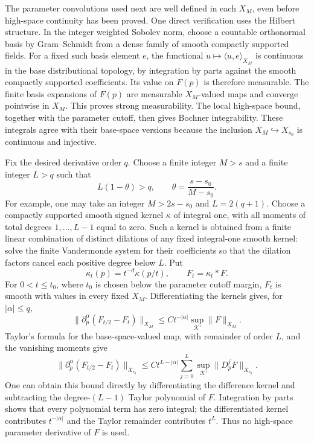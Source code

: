 \documentclass[
  english,
  11pt,
  reqno]{amsart}
\begin{document}
The parameter convolutions used next are well defined in each \(X_M\),
even before high-space continuity has been proved. One direct
verification uses the Hilbert structure. In the integer weighted Sobolev
norm, choose a countable orthonormal basis by Gram--Schmidt from a dense
family of smooth compactly supported fields. For a fixed such basis
element \(e\), the functional \(u\mapsto\langle u,e\rangle_{X_M}\) is
continuous in the base distributional topology, by integration by parts
against the smooth compactly supported coefficients. Its value on
\(F(p)\) is therefore measurable. The finite basis expansions of
\(F(p)\) are measurable \(X_M\)-valued maps and converge pointwise in
\(X_M\). This proves strong measurability. The local high-space bound,
together with the parameter cutoff, then gives Bochner integrability.
These integrals agree with their base-space versions because the
inclusion \(X_M\hookrightarrow X_{s_0}\) is continuous and injective.

Fix the desired derivative order \(q\). Choose a finite integer \(M>s\)
and a finite integer \(L>q\) such that%
 \[
L(1-\theta)>q,
\qquad \theta=\frac{s-s_0}{M-s_0}.
\] For example, one may take an integer \(M>2s-s_0\) and \(L=2(q+1)\).
Choose a compactly supported smooth signed kernel \(\kappa\) of integral
one, with all moments of total degrees \(1,\ldots,L-1\) equal to zero.
Such a kernel is obtained from a finite linear combination of distinct
dilations of any fixed integral-one smooth kernel: solve the finite
Vandermonde system for their coefficients so that the dilation factors
cancel each positive degree below \(L\). Put \[
\kappa_t(p)=t^{-d}\kappa(p/t),\qquad F_t=\kappa_t*F.
\] For \(0<t\le t_0\), where \(t_0\) is chosen below the parameter
cutoff margin, \(F_t\) is smooth with values in every fixed \(X_M\).
Differentiating the kernels gives, for \(|\alpha|\le q\),%
 \[
\|\partial_p^\alpha(F_{t/2}-F_t)\|_{X_M}
 \le C t^{-|\alpha|}
                \sup_{\mathcal K'}\|F\|_{X_M}.
\] Taylor's formula for the base-space-valued map, with remainder of
order \(L\), and the vanishing moments give%
 \[
\|\partial_p^\alpha(F_{t/2}-F_t)\|_{X_{s_0}}
 \le C t^{L-|\alpha|}
       \sum_{j=0}^L\sup_{\mathcal K'}\|D_p^jF\|_{X_{s_0}}.
\] One can obtain this bound directly by differentiating the difference
kernel and subtracting the degree-\((L-1)\) Taylor polynomial of \(F\).
Integration by parts shows that every polynomial term has zero integral;
the differentiated kernel contributes \(t^{-|\alpha|}\) and the Taylor
remainder contributes \(t^L\). Thus no high-space parameter derivative
of \(F\) is used.
\end{document}
